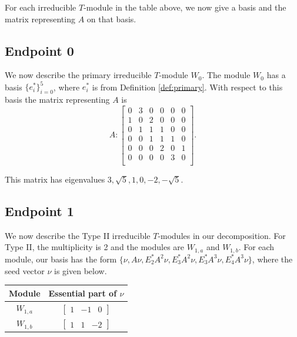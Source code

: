\documentclass[12pt,letterpaper]{article}
\newcommand{\rowvector}[1]{\begin{bmatrix} #1 \end{bmatrix}}
\begin{document}
For each irreducible $T$-module in the table above, we now give a basis and the matrix representing $A$ on that basis. 

\subsection{Endpoint 0}

We now describe the primary irreducible $T$-module $W_0$. The module $W_0$ has a basis $\{e_i^*\}_{i=0}^5$, where $e_i^*$ is from Definition \ref{def:primary}. With respect to this basis the matrix representing $A$ is
\begin{equation}
    A: \begin{bmatrix}
0 & 3 & 0 & 0 & 0 & 0 \\
1 & 0 & 2 & 0 & 0 & 0 \\
0 & 1 & 1 & 1 & 0 & 0 \\
0 & 0 & 1 & 1 & 1 & 0 \\
0 & 0 & 0 & 2 & 0 & 1 \\
0 & 0 & 0 & 0 & 3 & 0 \\
\end{bmatrix}.\label{eq:dod-I}
\end{equation}

This matrix has eigenvalues $3, \sqrt{5}, 1, 0, -2, -\sqrt{5}$.

\subsection{Endpoint 1}

We now describe the Type II irreducible $T$-modules in our decomposition. For Type II, the multiplicity is 2 and the modules are $W_{1,a}$ and $W_{1,b}$. For each module, our basis has the form $\{\nu, A\nu, E_2^*A^2\nu, E_3^*A^2\nu, E_3^*A^3\nu, E_4^*A^3\nu\}$, where the seed vector $\nu$ is given below.
\begin{center}
    \begin{tabular}{c | c}
    \toprule
       \textbf{Module}  & \textbf {Essential part of }$\nu$ \\
       \midrule
       $W_{1,a}$  & $\rowvector{1 & -1 & 0}$ \\[1.67pt]
       $W_{1,b}$  & $\rowvector{1 & 1 & -2}$ \\
    \bottomrule
    \end{tabular}
\end{center}
\end{document}
